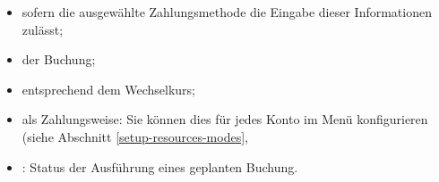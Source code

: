 \begin{itemize}
	\item {} sofern die ausgewählte Zahlungsmethode die Eingabe dieser Informationen zulässt;
	\item {} der Buchung;
	\item {} entsprechend dem Wechselkurs;
	\item {} als Zahlungsweise: Sie können dies für jedes Konto im Menü  konfigurieren (siehe Abschnitt \vref{setup-resources-modes}, %
	\item {}: Status der Ausführung eines geplanten Buchung.
\end{itemize}

